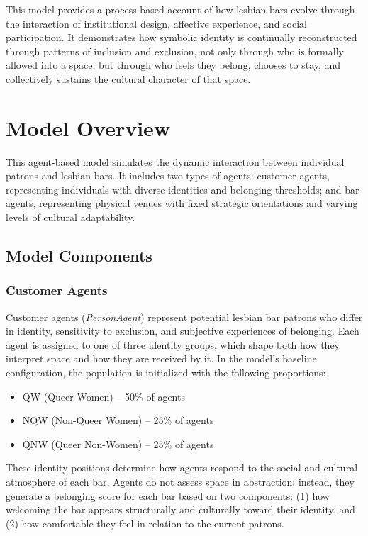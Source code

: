 \documentclass{article}
\begin{document}
This model provides a process-based account of how lesbian bars evolve through the interaction of institutional design, affective experience, and social participation. It demonstrates how symbolic identity is continually reconstructed through patterns of inclusion and exclusion, not only through who is formally allowed into a space, but through who feels they belong, chooses to stay, and collectively sustains the cultural character of that space.

\section{Model Overview}

This agent-based model simulates the dynamic interaction between individual patrons and lesbian bars. It includes two types of agents: customer agents, representing individuals with diverse identities and belonging thresholds; and bar agents, representing physical venues with fixed strategic orientations and varying levels of cultural adaptability. 

\subsection{Model Components}

\subsubsection{Customer Agents}

Customer agents (\textit{PersonAgent}) represent potential lesbian bar patrons who differ in identity, sensitivity to exclusion, and subjective experiences of belonging. Each agent is assigned to one of three identity groups, which shape both how they interpret space and how they are received by it. In the model's baseline configuration, the population is initialized with the following proportions:

\begin{itemize}
    \item QW (Queer Women) – 50\% of agents
    \item NQW (Non-Queer Women) – 25\% of agents
    \item QNW (Queer Non-Women) – 25\% of agents
\end{itemize}

These identity positions determine how agents respond to the social and cultural atmosphere of each bar. Agents do not assess space in abstraction; instead, they generate a belonging score for each bar based on two components: (1) how welcoming the bar appears structurally and culturally toward their identity, and (2) how comfortable they feel in relation to the current patrons. 
\end{document}
